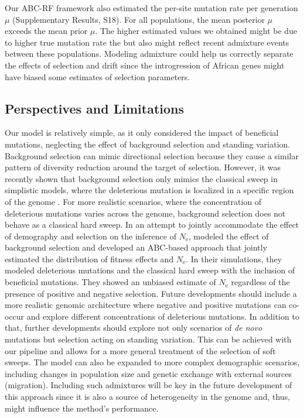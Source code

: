 \documentclass[a4paper, 12pt]{article}
\begin{document}
Our ABC-RF framework also estimated the per-site mutation rate per generation $\mu$ (Supplementary Results, S18). For all populations, the mean posterior $\mu$ exceeds the mean prior $\mu$. The higher estimated values we obtained might be due to higher true mutation rate the but also might reflect recent admixture events between these populations. Modeling admixture could help us correctly separate the effects of selection and drift since the introgression of African genes might have biased some estimates of selection parameters.

\subsection*{Perspectives and Limitations}

Our model is relatively simple, as it only considered the impact of beneficial mutations, neglecting the effect of background selection and standing variation. Background selection can mimic directional selection because they cause a similar pattern of diversity reduction around the target of selection. However, it was recently shown that background selection only mimics the classical sweep in simplistic models, where the deleterious mutation is localized in a specific region of the genome \citep{Schrider:2020hka}. For more realistic scenarios, where the concentration of deleterious mutations varies across the genome, background selection does not behave as a classical hard sweep. In an attempt to jointly accommodate the effect of demography and selection on the inference of $N_{\mathrm{e}}$,  \citet{Johri:2020ee} modeled the effect of background selection and developed an ABC-based approach that jointly estimated the distribution of fitness effects and $N_{\mathrm{e}}$. In their simulations, they modeled deleterious mutations and the classical hard sweep with the inclusion of beneficial mutations. They showed an unbiased estimate of $N_{\mathrm{e}}$ regardless of the presence of positive and negative selection. Future developments should include a more realistic genomic architecture where negative and positive mutations can co-occur and explore different concentrations of deleterious mutations. In addition to that, further developments should explore not only scenarios of \textit{de novo} mutations but selection acting on standing variation. This can be achieved with our pipeline and allows for a more general treatment of the selection of soft sweeps. The model can also be expanded to more complex demographic scenarios, including changes in population size and genetic exchange with external sources (migration). Including such admixtures will be key in the future development of this approach since it is also a source of heterogeneity in the genome and, thus, might influence the method's performance. 
\end{document}
